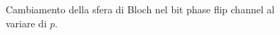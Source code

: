 \begin{esempio}
\begin{figure}[!ht]
	\caption{Cambiamento della sfera di Bloch nel bit phase flip channel al variare di $p$.}
    \label{fig:bit_phase_flip_Bloch}
    \end{figure}
\end{esempio}

